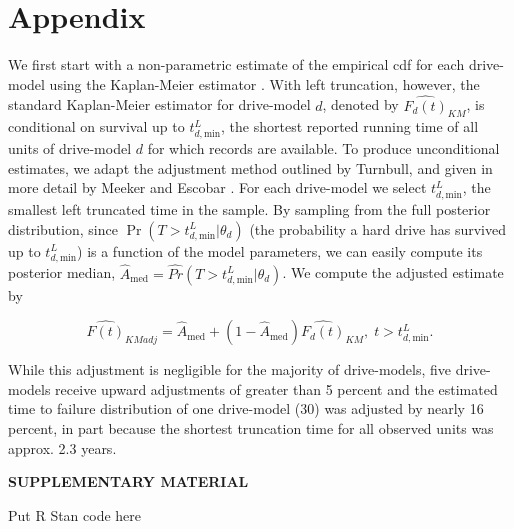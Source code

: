 \documentclass[12pt]{article}
\begin{document}
\section{Appendix}
\label{sec:Appendix}
We first start with a non-parametric estimate of the empirical cdf for each drive-model using the Kaplan-Meier estimator
\cite{kaplan}.  With left truncation, however, the standard Kaplan-Meier estimator for drive-model $d$, denoted by
$\widehat{F_d(t)}_{KM}$, is conditional on survival up to
$t_{d,\text{min}}^L$, the shortest reported running time of all units
of drive-model $d$ for which records are available. To produce
unconditional estimates, we adapt the adjustment method outlined by
Turnbull, and given in more detail by Meeker and Escobar
\cite{turnbull,meeker}.  For each drive-model we select
$t_{d,\text{min}}^L$, the smallest left truncated time in the sample.
By sampling from the full posterior distribution, since
$\Pr(T>t_{d,\text{min}}^L|\theta_d)$ (the probability a hard drive has
survived up to $t_{d,\text{min}}^L$) is a function of the model
parameters, we can easily compute its posterior median,
$\widehat{A}_{\text{med}} = \widehat{Pr}(T>t_{d,\text{min}}^L|\theta_d)$. We compute the adjusted estimate by

$$\widehat{F(t)}_{KMadj} = \widehat{A}_{\text{med}} + \left(1 - \widehat{A}_{\text{med}}\right)\widehat{F_d(t)}_{KM},\; t>t_{d,\text{min}}^L.$$

While this adjustment is negligible for the majority of drive-models, five drive-models receive upward adjustments of greater than 5 percent and the estimated time to failure distribution of one drive-model (30) was adjusted by nearly 16 percent, in part because the shortest truncation time for all observed units was approx. 2.3 years.

\pagebreak

\begin{center}
{\large\bf SUPPLEMENTARY MATERIAL}
\end{center}

\begin{description}

\item Put R Stan code here

\end{description}
\end{document}
